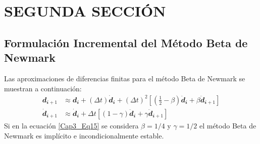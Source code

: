 \section{SEGUNDA SECCIÓN}

\subsection{Formulación Incremental del Método Beta de Newmark}

Las aproximaciones de diferencias finitas para el método Beta de Newmark se muestran a continuación:
\begin{subequations}\label{Cap3_Eq15}
	\begin{align}
		\mathbfit{d_{i+1}}       & \approx \mathbfit{d_{i}}+(\Delta t) \mathbfit{\dot{d}_{i}}+(\Delta t)^2\left[\left(\frac{1}{2}-\beta\right)\mathbfit{\ddot{d}_{i}}+\beta\mathbfit{\ddot{d}_{i+1}} \right]		\label{Cap3_Eq15_1} \\[2 mm]
		\mathbfit{\dot{d}_{i+1}} & \approx \mathbfit{\dot{d}_{i}}+\Delta t\left [(1-\gamma)\mathbfit{\ddot{d}_{i}}+\gamma\mathbfit{\ddot{d}_{i+1}}\right] \label{Cap3_Eq15_2}
	\end{align}
\end{subequations}
Si en la ecuación \ref{Cap3_Eq15} se considera $\beta=1/4$ y $\gamma=1/2$ el método Beta de Newmark es implícito e incondicionalmente estable.
